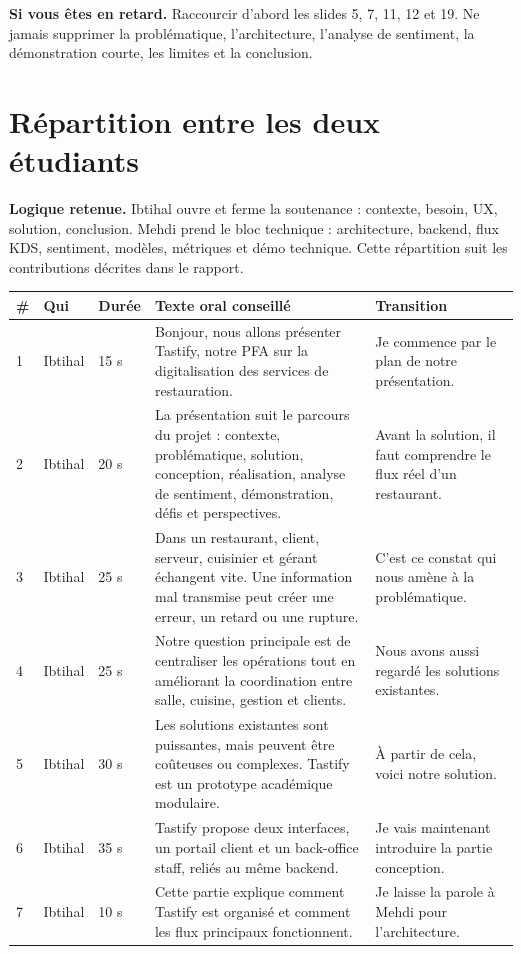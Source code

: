\documentclass[11pt,a4paper]{article}
\begin{document}
\textbf{Si vous êtes en retard.} Raccourcir d'abord les slides 5, 7, 11, 12 et 19. Ne jamais supprimer la problématique, l'architecture, l'analyse de sentiment, la démonstration courte, les limites et la conclusion.

\section{Répartition entre les deux étudiants}

\textbf{Logique retenue.} Ibtihal ouvre et ferme la soutenance : contexte, besoin, UX, solution, conclusion. Mehdi prend le bloc technique : architecture, backend, flux KDS, sentiment, modèles, métriques et démo technique. Cette répartition suit les contributions décrites dans le rapport.

\begin{longtable}{p{0.8cm}p{2cm}p{2cm}p{5.4cm}p{4.6cm}}
\toprule
\textbf{\#} & \textbf{Qui} & \textbf{Durée} & \textbf{Texte oral conseillé} & \textbf{Transition}\\
\midrule
1 & Ibtihal & 15 s & Bonjour, nous allons présenter Tastify, notre PFA sur la digitalisation des services de restauration. & Je commence par le plan de notre présentation.\\
2 & Ibtihal & 20 s & La présentation suit le parcours du projet : contexte, problématique, solution, conception, réalisation, analyse de sentiment, démonstration, défis et perspectives. & Avant la solution, il faut comprendre le flux réel d'un restaurant.\\
3 & Ibtihal & 25 s & Dans un restaurant, client, serveur, cuisinier et gérant échangent vite. Une information mal transmise peut créer une erreur, un retard ou une rupture. & C'est ce constat qui nous amène à la problématique.\\
4 & Ibtihal & 25 s & Notre question principale est de centraliser les opérations tout en améliorant la coordination entre salle, cuisine, gestion et clients. & Nous avons aussi regardé les solutions existantes.\\
5 & Ibtihal & 30 s & Les solutions existantes sont puissantes, mais peuvent être coûteuses ou complexes. Tastify est un prototype académique modulaire. & À partir de cela, voici notre solution.\\
6 & Ibtihal & 35 s & Tastify propose deux interfaces, un portail client et un back-office staff, reliés au même backend. & Je vais maintenant introduire la partie conception.\\
7 & Ibtihal & 10 s & Cette partie explique comment Tastify est organisé et comment les flux principaux fonctionnent. & Je laisse la parole à Mehdi pour l'architecture.\\

\end{longtable}
\end{document}
